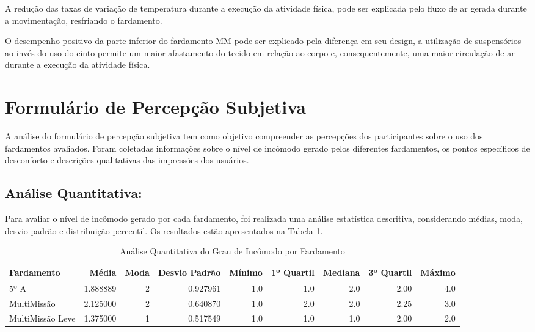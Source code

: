         A redução das taxas de variação de temperatura durante a execução da atividade física, 
        pode ser explicada pelo fluxo de ar gerada durante a movimentação, resfriando o fardamento.

        O desempenho positivo da parte inferior do fardamento \acrshort{MM} pode ser explicado pela 
        diferença em seu design, a utilização de suspensórios ao invés do uso do cinto permite um maior 
        afastamento do tecido em relação ao corpo e, consequentemente, uma maior circulação de ar 
        durante a execução da atividade física.


\section{Formulário de Percepção Subjetiva}
    A análise do formulário de percepção subjetiva tem como objetivo compreender as percepções dos 
    participantes sobre o uso dos fardamentos avaliados. Foram coletadas informações sobre o nível de 
    incômodo gerado pelos diferentes fardamentos, os pontos específicos de desconforto e descrições 
    qualitativas das impressões dos usuários.

    \subsection{Análise Quantitativa:}
        
        Para avaliar o nível de incômodo gerado por cada fardamento, foi realizada uma análise 
        estatística descritiva, considerando médias, moda, desvio padrão e distribuição percentil. Os resultados 
        estão apresentados na Tabela \ref{tab:analise_fardamento}.
        \begin{table}[H]
                \centering
                \caption{Análise Quantitativa do Grau de Incômodo por Fardamento}
                \label{tab:analise_fardamento}
                \footnotesize
                \begin{tabular}{lrrrrrrrr}
                \toprule
                Fardamento &     Média &  Moda &  Desvio Padrão &  Mínimo &  1º Quartil &  Mediana &  3º Quartil &  Máximo \\
                \midrule
                5º A             &  1.888889 &     2 &       0.927961 &     1.0 &         1.0 &      2.0 &        2.00 &     4.0 \\
                MultiMissão      &  2.125000 &     2 &       0.640870 &     1.0 &         2.0 &      2.0 &        2.25 &     3.0 \\
                MultiMissão Leve &  1.375000 &     1 &       0.517549 &     1.0 &         1.0 &      1.0 &        2.00 &     2.0 \\
                \bottomrule
                \end{tabular}
                \end{table}
    

